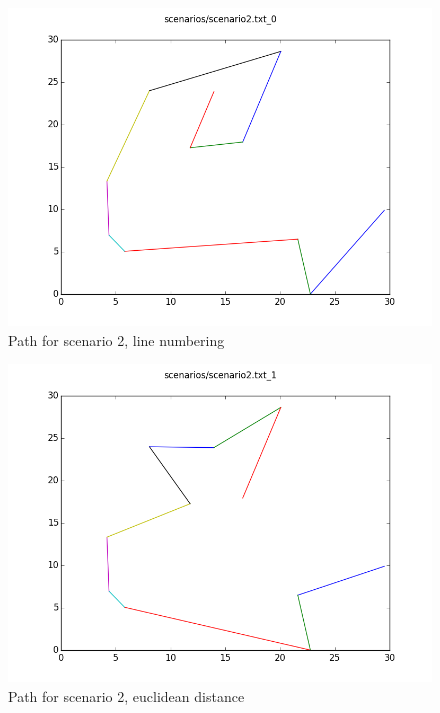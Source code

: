 \documentclass[paper=a4, fontsize=11pt]{scrartcl} %
\numberwithin{equation}{section} %
\numberwithin{figure}{section} %
\numberwithin{table}{section} %
\begin{document}
\begin{figure}[H]
	\centering
  	\includegraphics[width=1\textwidth]{results/2_0.png}
	\caption{Path for scenario 2, line numbering}
\end{figure}
\begin{figure}[H]
	\centering
  \includegraphics[width=1\textwidth]{results/2_1.png}
	\caption{Path for scenario 2, euclidean distance}
\end{figure}
\end{document}

